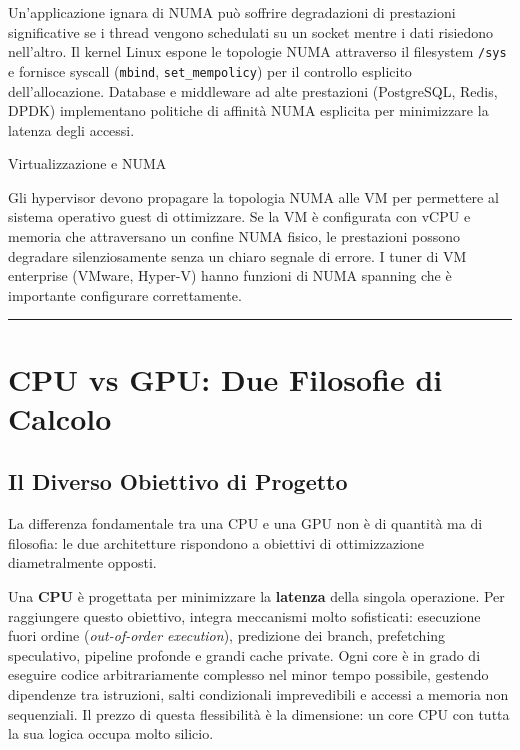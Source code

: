 \documentclass[
  italian,
  openany]{book}
\begin{document}
Un'applicazione ignara di NUMA può soffrire degradazioni di prestazioni
significative se i thread vengono schedulati su un socket mentre i dati
risiedono nell'altro. Il kernel Linux espone le topologie NUMA
attraverso il filesystem \texttt{/sys} e fornisce syscall
(\texttt{mbind}, \texttt{set\_mempolicy}) per il controllo esplicito
dell'allocazione. Database e middleware ad alte prestazioni (PostgreSQL,
Redis, DPDK) implementano politiche di affinità NUMA esplicita per
minimizzare la latenza degli accessi.

\begin{calloutwarning}{Virtualizzazione e NUMA}

Gli hypervisor devono propagare la topologia NUMA alle VM per permettere
al sistema operativo guest di ottimizzare. Se la VM è configurata con
vCPU e memoria che attraversano un confine NUMA fisico, le prestazioni
possono degradare silenziosamente senza un chiaro segnale di errore. I
tuner di VM enterprise (VMware, Hyper-V) hanno funzioni di NUMA spanning
che è importante configurare correttamente.

\end{calloutwarning}

\begin{center}\rule{0.5\linewidth}{0.5pt}\end{center}

\section{CPU vs GPU: Due Filosofie di
Calcolo}\label{cpu-vs-gpu-due-filosofie-di-calcolo}

\subsection{Il Diverso Obiettivo di
Progetto}\label{il-diverso-obiettivo-di-progetto}

La differenza fondamentale tra una CPU e una GPU non è di quantità ma di
filosofia: le due architetture rispondono a obiettivi di ottimizzazione
diametralmente opposti.

Una \textbf{CPU} è progettata per minimizzare la \textbf{latenza} della
singola operazione. Per raggiungere questo obiettivo, integra meccanismi
molto sofisticati: esecuzione fuori ordine (\emph{out-of-order
execution}), predizione dei branch, prefetching speculativo, pipeline
profonde e grandi cache private. Ogni core è in grado di eseguire codice
arbitrariamente complesso nel minor tempo possibile, gestendo dipendenze
tra istruzioni, salti condizionali imprevedibili e accessi a memoria non
sequenziali. Il prezzo di questa flessibilità è la dimensione: un core
CPU con tutta la sua logica occupa molto silicio.
\end{document}
